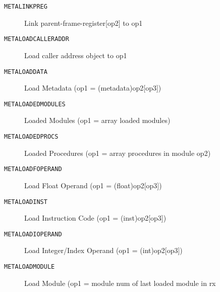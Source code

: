\begin{description}
\item[\texttt{METALINKPREG}]    Link parent-frame-register[op2] to op1\\

\end{description}
\begin{description}
\item[\texttt{METALOADCALLERADDR}]          Load caller address object to op1\\

\end{description}
\begin{description}
\item[\texttt{METALOADDATA}]    Load Metadata (op1 = (metadata)op2[op3])\\

\end{description}
\begin{description}
\item[\texttt{METALOADEDMODULES}]         Loaded Modules (op1 = array loaded modules)\\

\end{description}
\begin{description}
\item[\texttt{METALOADEDPROCS}]       Loaded Procedures (op1 = array procedures in module op2)\\

\end{description}
\begin{description}
\item[\texttt{METALOADFOPERAND}]        Load Float Operand (op1 = (float)op2[op3])\\

\end{description}
\begin{description}
\item[\texttt{METALOADINST}]    Load Instruction Code (op1 = (inst)op2[op3])\\

\end{description}
\begin{description}
\item[\texttt{METALOADIOPERAND}]        Load Integer/Index Operand (op1 = (int)op2[op3])\\

\end{description}
\begin{description}
\item[\texttt{METALOADMODULE}]      Load Module (op1 = module num of last loaded module in rx\\

\end{description}
